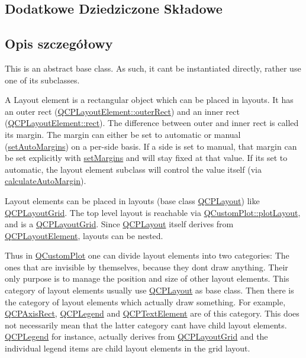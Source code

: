 \subsection*{Dodatkowe Dziedziczone Składowe}


\subsection{Opis szczegółowy}
This is an abstract base class. As such, it can\textquotesingle{}t be instantiated directly, rather use one of its subclasses.

A Layout element is a rectangular object which can be placed in layouts. It has an outer rect (\hyperlink{class_q_c_p_layout_element_a60bbddee2d1230c2414bd776f44d17b8}{Q\+C\+P\+Layout\+Element\+::outer\+Rect}) and an inner rect (\hyperlink{class_q_c_p_layout_element_affdfea003469aac3d0fac5f4e06171bc}{Q\+C\+P\+Layout\+Element\+::rect}). The difference between outer and inner rect is called its margin. The margin can either be set to automatic or manual (\hyperlink{class_q_c_p_layout_element_accfda49994e3e6d51ed14504abf9d27d}{set\+Auto\+Margins}) on a per-\/side basis. If a side is set to manual, that margin can be set explicitly with \hyperlink{class_q_c_p_layout_element_a8f450b1f3f992ad576fce2c63d8b79cf}{set\+Margins} and will stay fixed at that value. If it\textquotesingle{}s set to automatic, the layout element subclass will control the value itself (via \hyperlink{class_q_c_p_layout_element_a005c9f0fe84bc1591a2cf2c46fd477b4}{calculate\+Auto\+Margin}).

Layout elements can be placed in layouts (base class \hyperlink{class_q_c_p_layout}{Q\+C\+P\+Layout}) like \hyperlink{class_q_c_p_layout_grid}{Q\+C\+P\+Layout\+Grid}. The top level layout is reachable via \hyperlink{class_q_custom_plot_afd280d4d621ae64a106543a545c508d7}{Q\+Custom\+Plot\+::plot\+Layout}, and is a \hyperlink{class_q_c_p_layout_grid}{Q\+C\+P\+Layout\+Grid}. Since \hyperlink{class_q_c_p_layout}{Q\+C\+P\+Layout} itself derives from \hyperlink{class_q_c_p_layout_element}{Q\+C\+P\+Layout\+Element}, layouts can be nested.

Thus in \hyperlink{class_q_custom_plot}{Q\+Custom\+Plot} one can divide layout elements into two categories\+: The ones that are invisible by themselves, because they don\textquotesingle{}t draw anything. Their only purpose is to manage the position and size of other layout elements. This category of layout elements usually use \hyperlink{class_q_c_p_layout}{Q\+C\+P\+Layout} as base class. Then there is the category of layout elements which actually draw something. For example, \hyperlink{class_q_c_p_axis_rect}{Q\+C\+P\+Axis\+Rect}, \hyperlink{class_q_c_p_legend}{Q\+C\+P\+Legend} and \hyperlink{class_q_c_p_text_element}{Q\+C\+P\+Text\+Element} are of this category. This does not necessarily mean that the latter category can\textquotesingle{}t have child layout elements. \hyperlink{class_q_c_p_legend}{Q\+C\+P\+Legend} for instance, actually derives from \hyperlink{class_q_c_p_layout_grid}{Q\+C\+P\+Layout\+Grid} and the individual legend items are child layout elements in the grid layout. 

